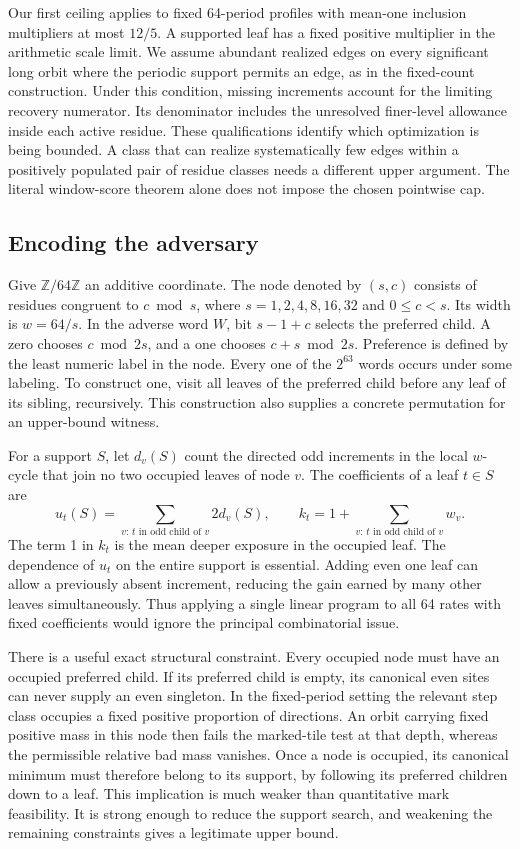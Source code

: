 \documentclass[12pt,letterpaper]{article}
\begin{document}
Our first ceiling applies to fixed 64-period profiles with mean-one inclusion multipliers at most \(12/5\). A supported leaf has a fixed positive multiplier in the arithmetic scale limit. We assume abundant realized edges on every significant long orbit where the periodic support permits an edge, as in the fixed-count construction. Under this condition, missing increments account for the limiting recovery numerator. Its denominator includes the unresolved finer-level allowance inside each active residue. These qualifications identify which optimization is being bounded. A class that can realize systematically few edges within a positively populated pair of residue classes needs a different upper argument. The literal window-score theorem alone does not impose the chosen pointwise cap.

\subsection{Encoding the adversary}

Give \(\mathbb Z/64\mathbb Z\) an additive coordinate. The node denoted by \((s,c)\) consists of residues congruent to \(c\bmod s\), where \(s=1,2,4,8,16,32\) and \(0\le c<s\). Its width is \(w=64/s\). In the adverse word \(W\), bit \(s-1+c\) selects the preferred child. A zero chooses \(c\bmod 2s\), and a one chooses \(c+s\bmod 2s\). Preference is defined by the least numeric label in the node. Every one of the \(2^{63}\) words occurs under some labeling. To construct one, visit all leaves of the preferred child before any leaf of its sibling, recursively. This construction also supplies a concrete permutation for an upper-bound witness.

For a support \(S\), let \(d_v(S)\) count the directed odd increments in the local \(w\)-cycle that join no two occupied leaves of node \(v\). The coefficients of a leaf \(t\in S\) are
\[
    u_t(S)=\sum_{v:\,t\text{ in odd child of }v} 2d_v(S),
    \qquad k_t=1+\sum_{v:\,t\text{ in odd child of }v}w_v .
\]
The term 1 in \(k_t\) is the mean deeper exposure in the occupied leaf. The dependence of \(u_t\) on the entire support is essential. Adding even one leaf can allow a previously absent increment, reducing the gain earned by many other leaves simultaneously. Thus applying a single linear program to all 64 rates with fixed coefficients would ignore the principal combinatorial issue.

There is a useful exact structural constraint. Every occupied node must have an occupied preferred child. If its preferred child is empty, its canonical even sites can never supply an even singleton. In the fixed-period setting the relevant step class occupies a fixed positive proportion of directions. An orbit carrying fixed positive mass in this node then fails the marked-tile test at that depth, whereas the permissible relative bad mass vanishes. Once a node is occupied, its canonical minimum must therefore belong to its support, by following its preferred children down to a leaf. This implication is much weaker than quantitative mark feasibility. It is strong enough to reduce the support search, and weakening the remaining constraints gives a legitimate upper bound.
\end{document}
